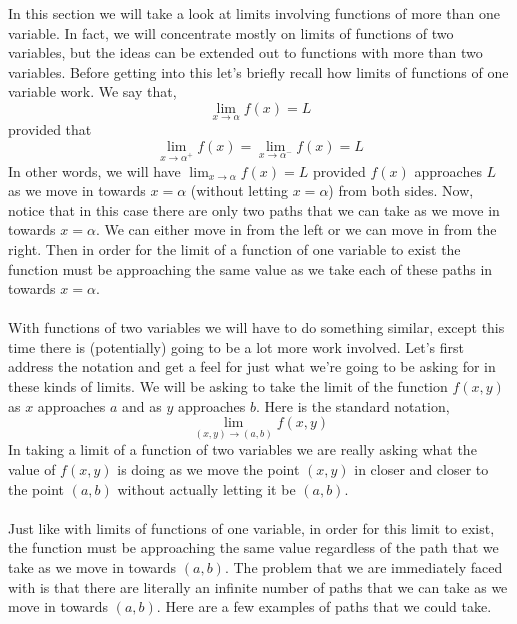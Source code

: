 \documentclass[10pt,reqno]{book}
\theoremstyle{definition}
\begin{document}
	In this section we will take a look at limits involving functions of more than one variable. In fact, we will concentrate mostly on limits of functions of two variables, but the ideas can be extended out to functions with more than two variables. Before getting into this let's briefly recall how limits of functions of one variable work. We say that,
	\[ \lim_{x \to \alpha} f(x) = L \]
	provided that 
	\[ \lim_{x \to \alpha^+} f(x) = \lim_{x \to \alpha^-} f(x) = L \]
	In other words, we will have $\displaystyle{\lim_{x \to \alpha} f(x)} = L $ provided $ f(x) $ approaches $ L $ as we move in towards $ x = \alpha $  (without letting $ x = \alpha $) from both sides. Now, notice that in this case there are only two paths that we can take as we move in towards $ x = \alpha $. We can either move in from the left or we can move in from the right. Then in order for the limit of a function of one variable to exist the function must be approaching the same value as we take each of these paths in towards $ x = \alpha $.\\ \\
	With functions of two variables we will have to do something similar, except this time there is (potentially) going to be a lot more work involved. Let's first address the notation and get a feel for just what we're going to be asking for in these kinds of limits. We will be asking to take the limit of the function $ f(x,y) $ as $ x $ approaches $ a $ and as $ y $ approaches $ b $. Here is the standard notation,
	\[ \lim_{(x,y) \to (a,b)} f(x,y) \]
	 In taking a limit of a function of two variables we are really asking what the value of $ f(x,y) $ is doing as we move the point $ (x,y) $ in closer and closer to the point $ (a,b) $ without actually letting it be $ (a,b) $.\\ \\
	 Just like with limits of functions of one variable, in order for this limit to exist, the function must be approaching the same value regardless of the path that we take as we move in towards $ (a,b) $. The problem that we are immediately faced with is that there are literally an infinite number of paths that we can take as we move in towards $ (a,b) $. Here are a few examples of paths that we could take.
	 
\end{document}
